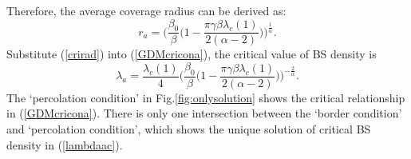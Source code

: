 \documentclass[final]{IEEEtran}
\begin{document}
Therefore, the average coverage radius can be derived as:
\begin{equation}\label{crirad}
    r_{a}=\bigg(\frac{\beta_0}{\beta}\bigg(1-\frac{\pi \gamma \beta\lambda_c(1)}{2(\alpha-2)}\bigg)\bigg)^{\frac{1}{\alpha}}.
\end{equation}
\indent Substitute (\ref{crirad}) into (\ref{GDMcricona}), the critical value of BS density is 
\begin{equation}\label{lambdaac}
    \lambda_a=\frac{\lambda_c(1)}{4}\bigg(\frac{\beta_0}{\beta}\bigg(1-\frac{\pi \gamma \beta\lambda_c(1)}{2(\alpha-2)}\bigg)\bigg)^{-\frac{2}{\alpha}}.
\end{equation}
\indent The `percolation condition' in Fig.\ref{fig:onlysolution} shows the critical relationship in (\ref{GDMcricona}). There is only one intersection between the `border condition' and `percolation condition', which shows the unique solution of critical BS density in (\ref{lambdaac}).  

\end{document}
